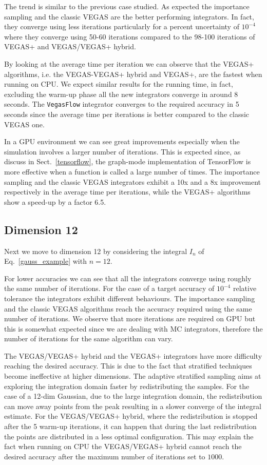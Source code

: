 \documentclass[../main/main.tex]{subfiles}
\begin{document}
The trend is similar to the previous case studied. As expected the importance sampling and the classic VEGAS are the better performing 
integrators. In fact, they converge using less iterations particularly for a percent uncertainty of $10^{-4}$ where they converge using 50-60 iterations compared to the 98-100 iterations of  VEGAS+ and VEGAS/VEGAS+ hybrid.

By looking at the average time per iteration we can observe that the VEGAS+ algorithms, i.e. the VEGAS-VEGAS+ hybrid and VEGAS+,  are the fastest when running on CPU.  We expect similar results for the running time, in fact, excluding the warm-up phase all the new integrators converge in around 8 seconds. The \texttt{VegasFlow} integrator converges to the required accuracy in 5 seconds since the average time per iterations is better compared to
the classic VEGAS one.

In a GPU environment we can see great improvements especially when the simulation involves a larger number of iterations.
This is expected since, as discuss in Sect.~\ref{tensorflow},  the graph-mode implementation of TensorFlow  is more effective when a function is called a large number of times. The importance sampling and the classic VEGAS integrators exhibit a 10x and a 8x improvement respectively in the average time per iterations, while the VEGAS+ algorithms show a speed-up by a factor 6.5.

 
 \subsection{Dimension 12}
 Next we move to dimension 12 by considering the integral $I_n$ of Eq.~\ref{gauss_example} with $n = 12$.
 
 For lower accuracies we can see that all the integrators converge using roughly the same number of iterations. For the case of a target accuracy of $10^{-4}$ relative tolerance the integrators exhibit different behaviours. The importance sampling and the classic VEGAS algorithms reach the accuracy required using the same number of iterations. We observe that more iterations are required on GPU but this is somewhat expected since we are dealing with MC integrators, therefore the number of iterations for the same algorithm can vary.
 
The VEGAS/VEGAS+ hybrid and the VEGAS+ integrators have more difficulty reaching the desired accuracy. This is due to the fact that 
stratified techniques become ineffective at higher dimensions. The adaptive stratified sampling aims at exploring the integration domain faster by redistributing the samples. For the case of a 12-dim Gaussian, due to the large integration domain, the redistribution can move away points from the peak resulting in a slower converge of the integral estimate. 
For the VEGAS/VEGAS+ hybrid, where the redistribution is stopped after the 5 warm-up iterations, it can happen that during the last redistribution the points are distributed in a less optimal configuration. This may explain the fact when running on CPU the VEGAS/VEGAS+ hybrid cannot reach the desired accuracy after the maximum number of iterations set to $1000$.
\end{document}
